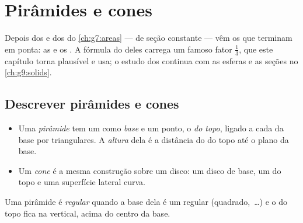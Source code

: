 \chapter{Pirâmides e cones}\label{ch:g8:solids}

Depois dos  e dos  do \cref{ch:g7:areas} ---  de
seção constante --- vêm os  que terminam em ponta: as 
e os . A fórmula do  deles carrega um famoso fator
$\frac13$, que este capítulo torna plausível e usa; o estudo dos
 continua com as esferas e as seções no \cref{ch:g9:solids}.

\section{Descrever pirâmides e cones}

\begin{definition}\label{def:g8:solids:def}
\begin{itemize}
  \item Uma \emph{pirâmide} tem um  como
        \emph{base} e um ponto, o \emph{ do topo}, ligado a
        cada  da base por  triangulares. A \emph{altura}
        dela é a distância do  do topo até o plano da base.
  \item Um \emph{cone} é a mesma construção sobre um
        disco: um disco de base, um  do topo e uma superfície
        lateral curva.
\end{itemize}
Uma pirâmide é \emph{regular} quando a base dela é um  regular
(quadrado, \,\dots) e o  do topo fica na
vertical, acima do centro da base.
\end{definition}

